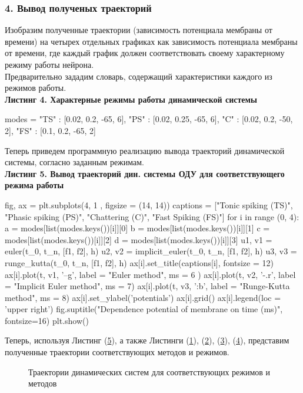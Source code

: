 \subsubsection{4. Вывод полученых траекторий}
Изобразим полученные траектории (зависимость потенциала мембраны от времени) на четырех отдельных графиках как зависимость потенциала мембраны от времени, где каждый график должен соответствовать своему характерному режиму работы нейрона. \\
Предварительно зададим словарь, содержащий характеристики каждого из режимов работы. \\
\textbf{Листинг 4. Характерные режимы работы динамической системы}
\hypertarget{lst4}{}
\begin{python}
modes = {
          "TS" : [0.02, 0.2, -65, 6],
          "PS" : [0.02, 0.25, -65, 6],
          "C"  : [0.02, 0.2, -50, 2],
          "FS" : [0.1, 0.2, -65, 2]
}
\end{python}
Теперь приведем программную реализацию вывода траекторий динамической системы, согласно заданным режимам. \\
\textbf{Листинг 5. Вывод траекторий дин. системы ОДУ для соответствующего режима работы}
\hypertarget{lst}{}
\begin{python}
fig, ax = plt.subplots(4, 1 , figsize = (14, 14))
captions = ["Tonic spiking (TS)", "Phasic spiking (PS)", "Chattering (C)", "Fast Spiking (FS)"]
for i in range (0, 4):
  a = modes[list(modes.keys())[i]][0]
  b = modes[list(modes.keys())[i]][1]
  c = modes[list(modes.keys())[i]][2]
  d = modes[list(modes.keys())[i]][3]
  u1, v1 = euler(t_0, t_n, [f1, f2], h)
  u2, v2 = implicit_euler(t_0, t_n, [f1, f2], h)
  u3, v3 = runge_kutta(t_0, t_n, [f1, f2], h)
  ax[i].set_title(captions[i], fontsize = 12)
  ax[i].plot(t, v1, '--g', label = "Euler method", ms = 6 )
  ax[i].plot(t, v2, '-.r', label = "Implicit Euler method", ms = 7)
  ax[i].plot(t, v3, ':b', label = "Runge-Kutta method", ms = 8)
  ax[i].set_ylabel('potentials')
  ax[i].grid()
  ax[i].legend(loc = 'upper right')
fig.suptitle("Dependence potential of membrane on time (ms)", fontsize=16)
plt.show()

\end{python}
\clearpage
Теперь, используя Листинг (\hyperlink{lst}{5}), а также Листинги (\hyperlink{lst1}{1}), (\hyperlink{lst2}{2}), (\hyperlink{lst3}{3}), (\hyperlink{lst4}{4}), представим полученные траектории соответствующих методов и режимов. 
\hypertarget{res4}{}
\begin{figure}[h]
\caption{Траектории динамических систем для соответствующих режимов и методов}
\end{figure}
